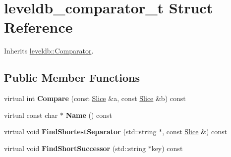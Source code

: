 \hypertarget{structleveldb__comparator__t}{}\section{leveldb\+\_\+comparator\+\_\+t Struct Reference}
\label{structleveldb__comparator__t}


Inherits \mbox{\hyperlink{structleveldb_1_1_comparator}{leveldb\+::\+Comparator}}.

\subsection*{Public Member Functions}
\begin{DoxyCompactItemize}
\item 
\mbox{\label{structleveldb__comparator__t_abad34abeefd52bcfd421e14f426f6d05}} 
virtual int {\bfseries Compare} (const \mbox{\hyperlink{classleveldb_1_1_slice}{Slice}} \&a, const \mbox{\hyperlink{classleveldb_1_1_slice}{Slice}} \&b) const
\item 
\mbox{\label{structleveldb__comparator__t_aaf7e79d77687d0542037ae5310296180}} 
virtual const char $\ast$ {\bfseries Name} () const
\item 
\mbox{\label{structleveldb__comparator__t_ad5bc952c5129d060c1ffe7a830eb3820}} 
virtual void {\bfseries Find\+Shortest\+Separator} (std\+::string $\ast$, const \mbox{\hyperlink{classleveldb_1_1_slice}{Slice}} \&) const
\item 
\mbox{\label{structleveldb__comparator__t_a46671a92506b28d1df61125499df3d23}} 
virtual void {\bfseries Find\+Short\+Successor} (std\+::string $\ast$key) const
\end{DoxyCompactItemize}
